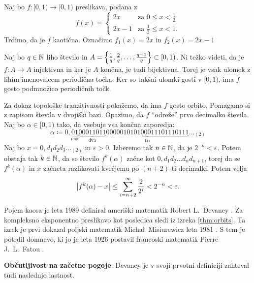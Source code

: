 \begin{zgled} \label{ex:double}
    Naj bo \(f \colon [0, 1) \to [0, 1)\) preslikava, podana z
    \[
        f (x) =
        \begin{cases}
            2x & \text{za } 0 \leq x < \frac{1}{2}\\
            2x - 1 & \text{za } \frac{1}{2} \leq x < 1.
        \end{cases}
    \]
    Trdimo, da je \(f\) kaotična. Označimo \(f_1 (x) = 2 x\) in \(f_2 (x) = 2x - 1\)

    Naj bo \(q \in \mathbb N\) liho število in \(A = \left\{ \frac{1}{q}, \frac{2}{q}, \dots, \frac{q - 1}{q} \right\} \subset [0, 1)\). Ni težko videti, da je \(f \colon A \to A\) injektivna in ker je \(A\) končna, je tudi bijektivna. Torej je vsak ulomek z lihim imenovalcem periodična točka. Ker so takšni ulomki gosti v \([0, 1)\), ima \(f\) gosto podmnožico periodičnih točk.

    Za dokaz topološke tranzitivnosti pokažemo, da ima \(f\) gosto orbito. Pomagamo si z zapisom števila v dvojiški bazi. Opazimo, da \(f\) ``odreže'' prvo decimalko števila. Naj bo \(\alpha \in [0, 1)\) tako, da vsebuje vsa končna zaporedja:
    \[\alpha \coloneq 0, \underbrace{0 1}_{\text{ena}} \underbrace{00011011}_{\text{dva}} \underbrace{000 001 010 100 011 101 110 111}_{\text{tri}} \dots_{(2)}\]
    Naj bo \(x = 0, d_1 d_2 d_3 \dots_{(2)}\) in \(\varepsilon > 0\). Izberemo tak \(n \in \mathbb N\), da je \(2^{- n} < \varepsilon\). Potem obstaja tak \(k \in \mathbb N\), da se število \(f^k (\alpha)\) začne kot \(0, d_1 d_2 \dots d_n d_{n + 1}\), torej da se \(f^k (\alpha)\) in \(x\) začneta razlikovati kvečjemu po \((n + 2)\)-ti decimalki. Potem velja
    \[\left\lvert f^k (\alpha) - x\right\rvert \leq \sum_{i = n + 2}^{\infty} \frac{2}{2^{i}} < 2^{- n} < \varepsilon.\]
\end{zgled}

\noindent Pojem kaosa je leta \num{1989} definiral ameriški matematik Robert L.~Devaney \cite{Devaney_1986}. Za kompleksno eksponentno preslikavo kot posledica sledi iz izreka  \ref{thm:orbits}. Ta izrek je prvi dokazal poljski matematik Micha\l\ Misiurewicz leta \num{1981} \cite{Misiurewicz_1981}. S tem je potrdil domnevo, ki jo je leta \num{1926} postavil francoski matematik Pierre J.~L.~Fatou \cite{Fatou_1926}.

\vspace{1cm}

\noindent \textbf{Občutljivost na začetne pogoje}.
Devaney je v svoji prvotni definiciji zahteval tudi naslednjo lastnost.

